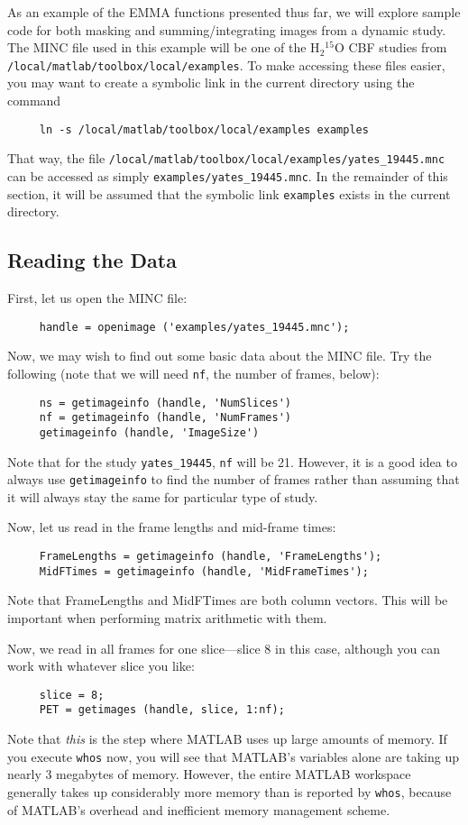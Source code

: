 As an example of the EMMA functions presented thus far, we will
explore sample code for both masking and summing/integrating images
from a dynamic study.  The MINC file used in this example will be one
of the H$_2$$^{15}$O CBF studies from 
\verb|/local/matlab/toolbox/local/examples|.  To make accessing these files easier, you may want to create a symbolic link in the current directory using the command
\begin{verbatim}
     ln -s /local/matlab/toolbox/local/examples examples
\end{verbatim}
That way, the file
\verb|/local/matlab/toolbox/local/examples/yates_19445.mnc| can be
accessed as simply \verb|examples/yates_19445.mnc|.  In the remainder
of this section, it will be assumed that the symbolic link
\verb|examples| exists in the current directory.

\subsection{Reading the Data}

First, let us open the MINC file:
\begin{verbatim}
     handle = openimage ('examples/yates_19445.mnc');
\end{verbatim}
Now, we may wish to find out some basic data about the MINC file.  Try
the following (note that we will need \verb|nf|, the number of frames,
below):
\begin{verbatim}
     ns = getimageinfo (handle, 'NumSlices')
     nf = getimageinfo (handle, 'NumFrames')
     getimageinfo (handle, 'ImageSize')
\end{verbatim}
Note that for the study \verb|yates_19445|, \verb|nf| will be 21.
However, it is a good idea to always use \verb|getimageinfo| to find
the number of frames rather than assuming that it will always stay the
same for particular type of study.

Now, let us read in the frame lengths and mid-frame times:
\begin{verbatim}
     FrameLengths = getimageinfo (handle, 'FrameLengths');
     MidFTimes = getimageinfo (handle, 'MidFrameTimes');
\end{verbatim}
Note that FrameLengths and MidFTimes are both column vectors.  This
will be important when performing matrix arithmetic with them.

Now, we read in all frames for one slice---slice 8 in this case,
although you can work with whatever slice you like:
\begin{verbatim}
     slice = 8;
     PET = getimages (handle, slice, 1:nf);
\end{verbatim}
Note that {\em this} is the step where MATLAB uses up large amounts of
memory.  If you execute \verb|whos| now, you will see that MATLAB's
variables alone are taking up nearly 3 megabytes of memory.  However,
the entire MATLAB workspace generally takes up considerably more
memory than is reported by \verb|whos|, because of MATLAB's
overhead and inefficient memory management scheme.

